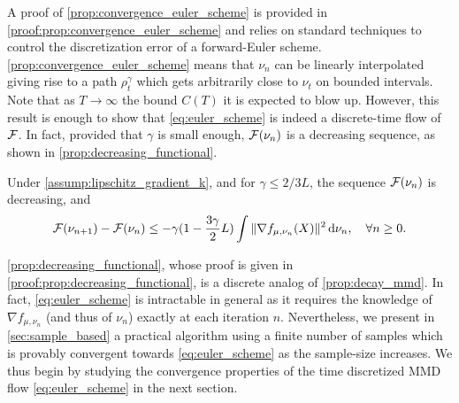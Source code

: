  A proof of \cref{prop:convergence_euler_scheme} is provided in \cref{proof:prop:convergence_euler_scheme} and relies on standard techniques to control the discretization error of a forward-Euler scheme.
\cref{prop:convergence_euler_scheme} means that $\nu_n$ can be linearly interpolated giving rise to a path $\rho_t^{\gamma}$ which gets arbitrarily close to $\nu_t$ on bounded intervals. Note that as $T \rightarrow \infty$ the bound $C(T)$ it is expected to blow up. However, this result is enough to show that \cref{eq:euler_scheme} is indeed a discrete-time flow of ${{\mathcal F}}$. In fact, provided that $\gamma$ is small enough, ${{\mathcal F}}(\nu_n)$ is a decreasing sequence, as shown in \cref{prop:decreasing_functional}.
\begin{proposition}\label{prop:decreasing_functional}
 	Under \cref{assump:lipschitz_gradient_k}, and for $\gamma \leq 2/3L$, the sequence ${{\mathcal F}}(\nu_n)$ is decreasing, and
	\begin{align*}
	{{\mathcal F}}(\nu_{n+1})-{{\mathcal F}}(\nu_n)\leq -\gamma (1-\frac{3\gamma}{2}L )\int \Vert \nabla f_{\mu, \nu_n}(X)\Vert^2 \mathop{}\!\mathrm{d} \nu_n, \quad\forall n\geq 0.
	\end{align*}
\end{proposition}
\cref{prop:decreasing_functional}, whose proof is given in \cref{proof:prop:decreasing_functional}, is a discrete analog of \cref{prop:decay_mmd}. %
In fact, \cref{eq:euler_scheme} is intractable in general as it requires the knowledge of $\nabla f_{\mu,\nu_n}$ (and thus of $\nu_n$) exactly at each iteration $n$. Nevertheless, we present in \cref{sec:sample_based} a practical algorithm using a finite number of samples which is provably convergent towards \cref{eq:euler_scheme} as the sample-size increases. We thus begin by studying the convergence properties of the time discretized MMD flow \cref{eq:euler_scheme} in the next section.%
